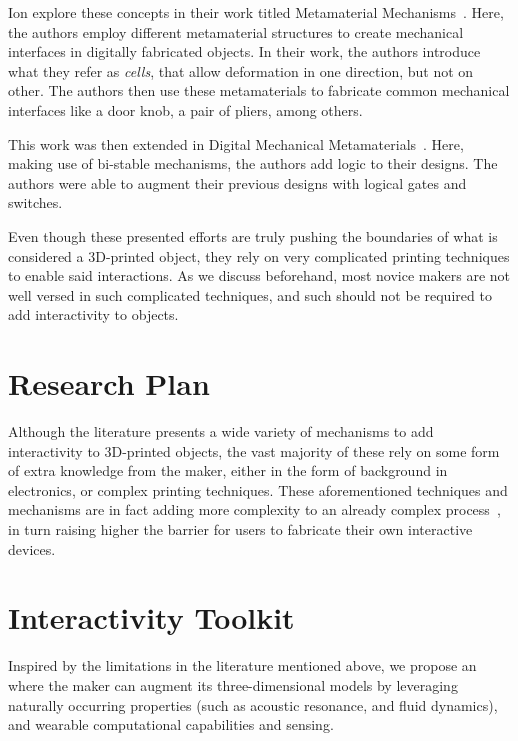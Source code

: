       Ion \etal explore these concepts in their work titled Metamaterial
      Mechanisms~\cite{Ion:2016kx}. Here, the authors employ different
      metamaterial structures to create mechanical interfaces in digitally
      fabricated objects. In their work, the authors introduce what they refer
      as \emph{cells}, that allow deformation in one direction, but not on
      other. The authors then use these metamaterials to fabricate common
      mechanical interfaces like a door knob, a pair of pliers, among others.

      This work was then extended in Digital Mechanical
      Metamaterials~\cite{Ion:2017bo}. Here, making use of bi-stable
      mechanisms, the authors add logic to their designs. The authors were able
      to augment their previous designs with logical gates and switches.

      Even though these presented efforts are truly pushing the boundaries of
      what is considered a 3D-printed object, they rely on very complicated
      printing techniques to enable said interactions. As we discuss
      beforehand, most novice makers are not well versed in such complicated
      techniques, and such should not be required to add interactivity to
      objects.

  \section{Research Plan}
    Although the literature presents a wide variety of mechanisms to add
    interactivity to 3D-printed objects, the vast majority of these rely on
    some form of extra knowledge from the maker, either in the form of
    background in electronics, or complex printing techniques. These
    aforementioned techniques and mechanisms are in fact adding more complexity
    to an already complex process~\cite{Hudson:2016hi, Mellis:2012ba,
    Weichel:2014ed}, in turn raising higher the barrier for users to fabricate
    their own interactive devices.

  \section{Interactivity Toolkit}
    Inspired by the limitations in the literature mentioned above, we propose
    an \itoolkit where the maker can augment its three-dimensional models by
    leveraging naturally occurring properties (such as acoustic resonance, and
    fluid dynamics), and wearable computational capabilities and sensing.

